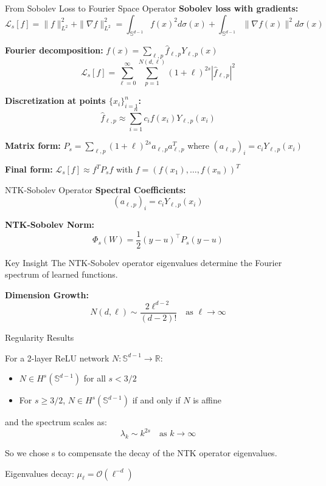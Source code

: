 \documentclass{beamer}
\newcommand{\R}{\mathbb{R}}
\newcommand{\Sd}{\mathbb{S}^{d-1}}
\begin{document}
\begin{frame}{From Sobolev Loss to Fourier Space Operator}
\textbf{Sobolev loss with gradients:}
\[ \mathcal{L}_s[f] = \|f\|_{L^2}^2 + \|\nabla f\|_{L^2}^2 = \int_{\Sd} f(x)^2 d\sigma(x) + \int_{\Sd} \|\nabla f(x)\|^2 d\sigma(x) \]

\textbf{Fourier decomposition:} $f(x) = \sum_{\ell,p} \hat{f}_{\ell,p} Y_{\ell,p}(x)$
\[ \mathcal{L}_s[f] = \sum_{\ell=0}^{\infty} \sum_{p=1}^{N(d,\ell)} (1+\ell)^{2s} |\hat{f}_{\ell,p}|^2 \]

\textbf{Discretization at points $\{x_i\}_{i=1}^n$:}
\[ \hat{f}_{\ell,p} \approx \sum_{i=1}^n c_i f(x_i) Y_{\ell,p}(x_i) \]

\textbf{Matrix form:} $P_s = \sum_{\ell,p} (1+\ell)^{2s} a_{\ell,p} a_{\ell,p}^T$
where $(a_{\ell,p})_i = c_i Y_{\ell,p}(x_i)$

\textbf{Final form:} $\mathcal{L}_s[f] \approx f^T P_s f$ with $f = (f(x_1), \ldots, f(x_n))^T$
\end{frame}


    \begin{frame}{NTK-Sobolev Operator}
    \textbf{Spectral Coefficients:}
    \[ (a_{\ell,p})_i = c_iY_{\ell,p}(x_i) \]

    \vspace{0.3em}
    \textbf{NTK-Sobolev Norm:}
    \[ \Phi_s(W) = \frac{1}{2}(y-u)^\top P_s(y-u) \]

    \begin{alertblock}{Key Insight}
        The NTK-Sobolev operator eigenvalues determine the Fourier spectrum of learned functions.
    \end{alertblock}
    
    \textbf{Dimension Growth:}
    \[ N(d,\ell) \sim \frac{2\ell^{d-2}}{(d-2)!} \quad \text{as } \ell \to \infty \]
\end{frame}





\begin{frame}{Regularity Results}
\begin{theorem}
For a 2-layer ReLU network $N: \Sd \to \R$:
\begin{itemize}
\item $N \in H^s(\Sd)$ for all $s < 3/2$
\item For $s \geq 3/2$, $N \in H^s(\Sd)$ if and only if $N$ is affine
\end{itemize}
\end{theorem}
and the spectrum scales as:
\[ \lambda_k \sim k^{2s} \quad \text{as } k \to \infty \]

So we chose s to compensate the decay of the NTK operator eigenvalues.
\item Eigenvalues decay: $\mu_\ell = \mathcal{O}(\ell^{-d})$
\end{frame}
\end{document}
